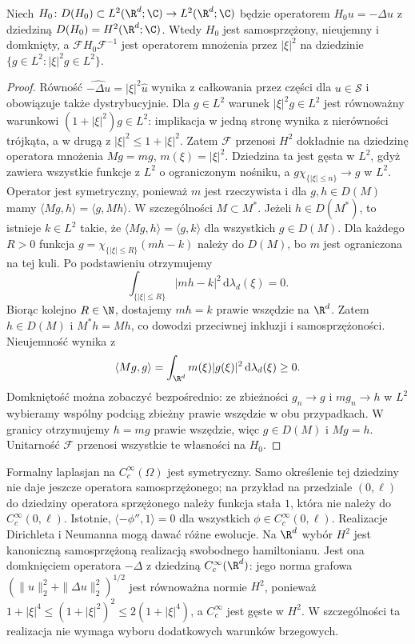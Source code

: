 \begin{twierdzenie}\label{thm:pde22-free-sa}
Niech $H_0\colon D(H_0)\subset L^2(\R^d;\C)\to L^2(\R^d;\C)$
będzie operatorem $H_0u=-\Delta u$ z dziedziną
$D(H_0)=H^2(\R^d;\C)$. Wtedy $H_0$ jest samosprzężony,
nieujemny i domknięty, a $\mathcal F H_0\mathcal F^{-1}$
jest operatorem mnożenia przez $|\xi|^2$ na dziedzinie
$\{g\in L^2:|\xi|^2g\in L^2\}$.
\end{twierdzenie}
\begin{proof}
Równość $\widehat{-\Delta u}=|\xi|^2\widehat u$
wynika z całkowania przez części dla $u\in\mathcal S$
i obowiązuje także dystrybucyjnie.
Dla $g\in L^2$ warunek $|\xi|^2g\in L^2$
jest równoważny warunkowi $(1+|\xi|^2)g\in L^2$:
implikacja w jedną stronę wynika z nierówności
trójkąta, a w drugą z $|\xi|^2\le1+|\xi|^2$.
Zatem $\mathcal F$ przenosi $H^2$ dokładnie na
dziedzinę operatora mnożenia
$Mg=mg$, $m(\xi)=|\xi|^2$.
Dziedzina ta jest gęsta w $L^2$, gdyż zawiera
wszystkie funkcje z $L^2$ o ograniczonym nośniku,
a $g\chi_{\{|\xi|\le n\}}\to g$ w $L^2$.
Operator jest symetryczny, ponieważ $m$ jest
rzeczywista i dla $g,h\in D(M)$ mamy
$\langle Mg,h\rangle=\langle g,Mh\rangle$.
W szczególności $M\subset M^*$.
Jeżeli $h\in D(M^*)$, to istnieje $k\in L^2$
takie, że $\langle Mg,h\rangle=\langle g,k\rangle$
dla wszystkich $g\in D(M)$. Dla każdego $R>0$
funkcja $g=\chi_{\{|\xi|\le R\}}(mh-k)$ należy
do $D(M)$, bo $m$ jest ograniczona na tej kuli.
Po podstawieniu otrzymujemy
\[
 \int_{\{|\xi|\le R\}}|mh-k|^2\,\mathrm d\lambda_d(\xi)=0.
\]
Biorąc kolejno $R\in\N$, dostajemy $mh=k$ prawie
wszędzie na $\R^d$. Zatem $h\in D(M)$ i $M^*h=Mh$,
co dowodzi przeciwnej inkluzji i samosprzężoności.
Nieujemność wynika z
\[
 \langle Mg,g\rangle
 =\int_{\R^d}m(\xi)|g(\xi)|^2\,\mathrm d\lambda_d(\xi)\ge0.
\]
Domkniętość można zobaczyć bezpośrednio: ze
zbieżności $g_n\to g$ i $mg_n\to h$ w $L^2$
wybieramy wspólny podciąg zbieżny prawie wszędzie
w obu przypadkach. W granicy otrzymujemy $h=mg$
prawie wszędzie, więc $g\in D(M)$ i $Mg=h$.
Unitarność $\mathcal F$ przenosi wszystkie te
własności na $H_0$.
\end{proof}

\begin{uwaga}
Formalny laplasjan na $C_c^\infty(\Omega)$ jest
symetryczny. Samo określenie tej dziedziny nie daje
jeszcze operatora samosprzężonego; na przykład
na przedziale $(0,\ell)$ do dziedziny operatora
sprzężonego należy funkcja stała $1$, która nie
należy do $C_c^\infty(0,\ell)$. Istotnie,
$\langle-\phi'',1\rangle=0$ dla wszystkich
$\phi\in C_c^\infty(0,\ell)$.
Realizacje Dirichleta i Neumanna mogą dawać różne ewolucje.
Na $\R^d$ wybór $H^2$ jest kanoniczną samosprzężoną
realizacją swobodnego hamiltonianu. Jest ona
domknięciem operatora $-\Delta$ z dziedziną
$C_c^\infty(\R^d)$: jego norma grafowa
$(\|u\|_2^2+\|\Delta u\|_2^2)^{1/2}$ jest
równoważna normie $H^2$, ponieważ
$1+|\xi|^4\le(1+|\xi|^2)^2\le2(1+|\xi|^4)$,
a $C_c^\infty$ jest gęste w $H^2$.
W szczególności ta realizacja nie wymaga wyboru
dodatkowych warunków brzegowych.
\end{uwaga}

